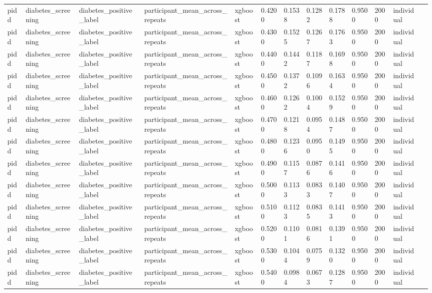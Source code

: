 \begin{tabular}{lllllllllllll}
pidd & diabetes\_screening & diabetes\_positive\_label & participant\_mean\_across\_repeats & xgboost & 0.4200 & 0.1538 & 0.1282 & 0.1788 & 0.9500 & 2000 & individual &  \\
pidd & diabetes\_screening & diabetes\_positive\_label & participant\_mean\_across\_repeats & xgboost & 0.4300 & 0.1525 & 0.1267 & 0.1763 & 0.9500 & 2000 & individual &  \\
pidd & diabetes\_screening & diabetes\_positive\_label & participant\_mean\_across\_repeats & xgboost & 0.4400 & 0.1442 & 0.1187 & 0.1698 & 0.9500 & 2000 & individual &  \\
pidd & diabetes\_screening & diabetes\_positive\_label & participant\_mean\_across\_repeats & xgboost & 0.4500 & 0.1372 & 0.1096 & 0.1634 & 0.9500 & 2000 & individual &  \\
pidd & diabetes\_screening & diabetes\_positive\_label & participant\_mean\_across\_repeats & xgboost & 0.4600 & 0.1262 & 0.1004 & 0.1529 & 0.9500 & 2000 & individual &  \\
pidd & diabetes\_screening & diabetes\_positive\_label & participant\_mean\_across\_repeats & xgboost & 0.4700 & 0.1218 & 0.0954 & 0.1487 & 0.9500 & 2000 & individual &  \\
pidd & diabetes\_screening & diabetes\_positive\_label & participant\_mean\_across\_repeats & xgboost & 0.4800 & 0.1236 & 0.0950 & 0.1495 & 0.9500 & 2000 & individual &  \\
pidd & diabetes\_screening & diabetes\_positive\_label & participant\_mean\_across\_repeats & xgboost & 0.4900 & 0.1157 & 0.0876 & 0.1416 & 0.9500 & 2000 & individual &  \\
pidd & diabetes\_screening & diabetes\_positive\_label & participant\_mean\_across\_repeats & xgboost & 0.5000 & 0.1133 & 0.0833 & 0.1407 & 0.9500 & 2000 & individual &  \\
pidd & diabetes\_screening & diabetes\_positive\_label & participant\_mean\_across\_repeats & xgboost & 0.5100 & 0.1123 & 0.0835 & 0.1413 & 0.9500 & 2000 & individual &  \\
pidd & diabetes\_screening & diabetes\_positive\_label & participant\_mean\_across\_repeats & xgboost & 0.5200 & 0.1101 & 0.0816 & 0.1391 & 0.9500 & 2000 & individual &  \\
pidd & diabetes\_screening & diabetes\_positive\_label & participant\_mean\_across\_repeats & xgboost & 0.5300 & 0.1044 & 0.0759 & 0.1320 & 0.9500 & 2000 & individual &  \\
pidd & diabetes\_screening & diabetes\_positive\_label & participant\_mean\_across\_repeats & xgboost & 0.5400 & 0.0984 & 0.0673 & 0.1287 & 0.9500 & 2000 & individual &  \\

\end{tabular}
